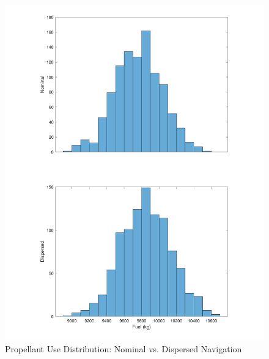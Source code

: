 \begin{figure}[H]
	\centering
	\begin{minipage}{4.3 in}
		\includegraphics[width=\linewidth]{Figures/hfuelnavvsnonav.pdf}
		\caption{Propellant Use Distribution: Nominal vs. Dispersed Navigation \label{fig:hfuelnavvsnonav} }
	\end{minipage}
\end{figure}



